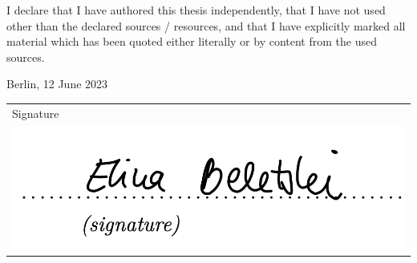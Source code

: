 \newpage
\thispagestyle{empty}

\begin{large}

\vspace*{2cm}

\noindent
I declare that I have authored this thesis independently, that I have not used other than the declared
sources / resources, and that I have explicitly marked all material which has been quoted either
literally or by content from the used sources. 

\vspace{2cm}

\noindent
Berlin, 12 June 2023
\vspace{3cm}

\hspace*{\fill}
\begin{tabular}{l}
Signature \\[1ex]
\includegraphics[scale=0.5]{Pictures/signature.png}
\end{tabular}
\end{large}
